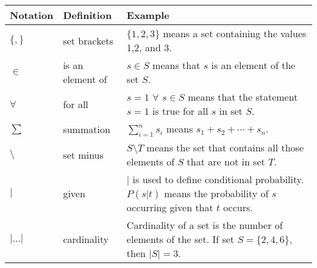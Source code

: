 \begin{center}
  \renewcommand\arraystretch{3}
  \begin{tabular}{ | p{2cm} | p{3cm} | p{10cm} | }
    \hline
    \bf Notation &  \bf Definition & \bf Example \\ 
    \hline 
    $\{ , \}$ & set brackets  & $\{1,2,3\}$ means a set containing the values 1,2, and 3. \\ 
    \hline
    $\in$ & is an element of  & $s \in S$ means that $s$ is an element of the set $S$. \\ 
    \hline
    $\forall$ & for all & $s=1$ $\forall$ $s \in S$ means that the statement $s=1$ is true for all $s$ in set $S$. \\ 
    \hline
    $\sum$ & summation & $\sum_{i=1}^{n}{s_i}$ means $s_1 + s_2 + \cdots + s_n$. \\ 
    \hline
    $\setminus$ & set minus & $S \setminus T$ means the set that contains all those elements of $S$ that are not in set $T$. \\ 
    \hline
    $\vert$ & given & $\vert$ is used to define conditional probability.  $P(s|t)$ means the probability of $s$ occurring given that $t$ occurs.  \\ 
    \hline
    $\left|...\right|$ & cardinality & Cardinality of a set is the number of elements of the set.  If set $S = \{2,4,6\}$, then $\left|S\right| = 3$. \\ 
    \hline
  \end{tabular}
\end{center}
